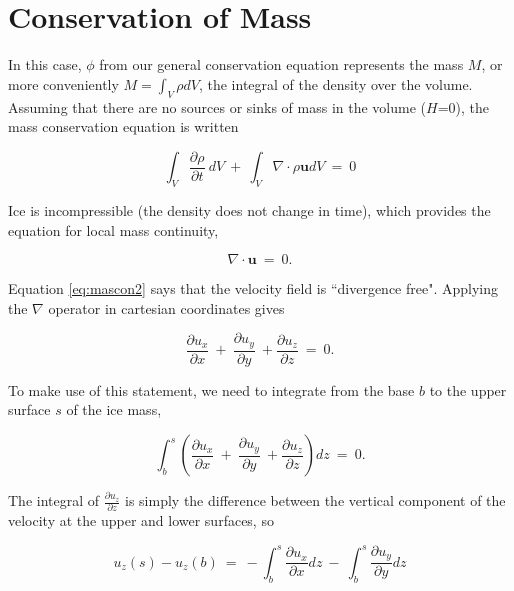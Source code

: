 \section{Conservation of Mass}

In this case, $\phi$ from our general conservation equation represents the mass $M$, or more conveniently
$M = \int_V \rho dV$, the integral of the density over the volume. Assuming that there are no sources or 
sinks of mass in the volume ($H$=0), the mass conservation equation is written

\begin{equation}
\int_{V}\frac{\partial \rho} {\partial t} ~dV ~+~ \int_{V} \nabla \cdot \rho \mathbf{u} dV~=~0
\label{eq:mascon1}
\end{equation}

Ice is incompressible (the density does not change in time), which provides the equation for 
local mass continuity,

\begin{equation}
\nabla \cdot \mathbf{u} ~=~0.
\label{eq:mascon2}
\end{equation}

Equation \eqref{eq:mascon2} says that the velocity field is ``divergence free". Applying the $\nabla$ 
operator in cartesian coordinates gives

\begin{equation}
\frac{\partial u_{x}}{\partial x}~+~\frac{\partial u_{y}}{\partial y} ~+\frac{\partial u_{z}}{\partial z}~=~0.  
\label{eq:mascon3}
\end{equation}

To make use of this statement, we need to integrate from the base $b$ to the upper surface $s$ of the ice mass,

\begin{equation}
\int_{b}^{s} \left( \frac{\partial u_{x}}{\partial x}~+~\frac{\partial u_{y}}{\partial y} ~+\frac{\partial u_{z}}{\partial z}\right) dz~=~0.  
\label{eq:mascon4}
\end{equation}

The integral of $\frac{\partial u_z}{\partial z}$ is simply the difference between
the vertical component of the velocity at the upper and lower surfaces, so

\begin{equation}
u_{z} \left(s\right)-u_{z} \left(b\right)~=~-\int_{b}^{s} \frac{\partial u_{x}}{\partial x} dz ~-~\int_{b}^{s} \frac{\partial u_{y}}{\partial y} dz  
\label{eq:mascon5}
\end{equation}

